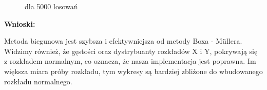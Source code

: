 \documentclass{article}
\begin{document}
\begin{enumerate}
		\begin{figure}[h]
			\begin{center}
				\caption{dla 5000 losowań}
			\end{center}
		\end{figure} 
	
		\textbf{Wnioski:}
		
		Metoda biegunowa jest szybsza i efektywniejsza od metody Boxa - M\"{u}llera. Widzimy również, że gęstości oraz dystrybuanty rozkładów X i Y, pokrywają się z rozkładem normalnym, co oznacza, że nasza implementacja jest poprawna. Im większa miara próby rozkładu, tym wykresy są bardziej zbliżone do wbudowanego rozkładu normalnego.
		
	\end{enumerate}
\end{document}
